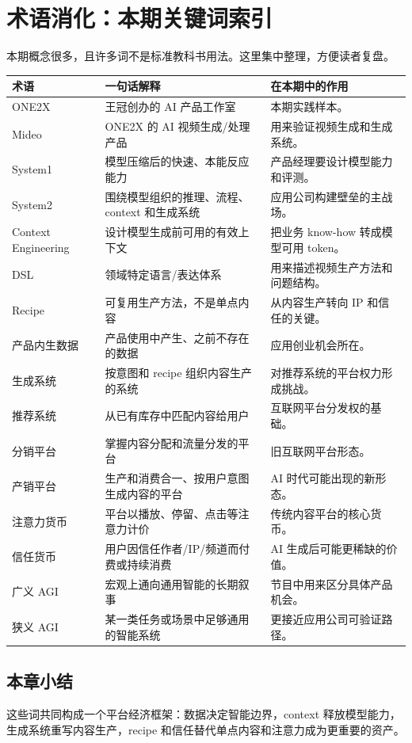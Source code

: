 \section{术语消化：本期关键词索引}

本期概念很多，且许多词不是标准教科书用法。这里集中整理，方便读者复盘。

\begin{longtable}{p{}p{}p{}}
\toprule
术语 & 一句话解释 & 在本期中的作用 \\
\midrule
ONE2X & 王冠创办的 AI 产品工作室 & 本期实践样本。 \\
Mideo & ONE2X 的 AI 视频生成/处理产品 & 用来验证视频生成和生成系统。 \\
System1 & 模型压缩后的快速、本能反应能力 & 产品经理要设计模型能力和评测。 \\
System2 & 围绕模型组织的推理、流程、context 和生成系统 & 应用公司构建壁垒的主战场。 \\
Context Engineering & 设计模型生成前可用的有效上下文 & 把业务 know-how 转成模型可用 token。 \\
DSL & 领域特定语言/表达体系 & 用来描述视频生产方法和问题结构。 \\
Recipe & 可复用生产方法，不是单点内容 & 从内容生产转向 IP 和信任的关键。 \\
产品内生数据 & 产品使用中产生、之前不存在的数据 & 应用创业机会所在。 \\
生成系统 & 按意图和 recipe 组织内容生产的系统 & 对推荐系统的平台权力形成挑战。 \\
推荐系统 & 从已有库存中匹配内容给用户 & 互联网平台分发权的基础。 \\
分销平台 & 掌握内容分配和流量分发的平台 & 旧互联网平台形态。 \\
产销平台 & 生产和消费合一、按用户意图生成内容的平台 & AI 时代可能出现的新形态。 \\
注意力货币 & 平台以播放、停留、点击等注意力计价 & 传统内容平台的核心货币。 \\
信任货币 & 用户因信任作者/IP/频道而付费或持续消费 & AI 生成后可能更稀缺的价值。 \\
广义 AGI & 宏观上通向通用智能的长期叙事 & 节目中用来区分具体产品机会。 \\
狭义 AGI & 某一类任务或场景中足够通用的智能系统 & 更接近应用公司可验证路径。 \\
\bottomrule
\end{longtable}

\subsection{本章小结}

这些词共同构成一个平台经济框架：数据决定智能边界，context 释放模型能力，生成系统重写内容生产，recipe 和信任替代单点内容和注意力成为更重要的资产。

